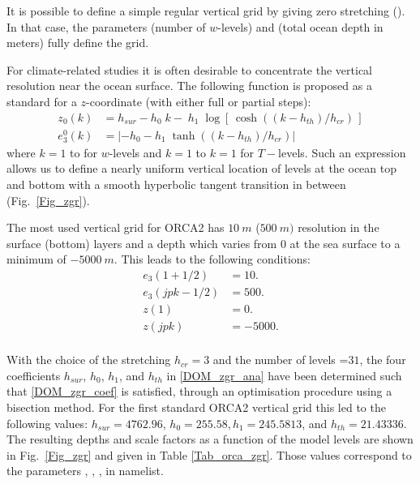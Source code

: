 {It is possible to define a simple regular vertical grid by giving zero stretching (). 
In that case, the parameters  (number of $w$-levels) and  
(total ocean depth in meters) fully define the grid. 

For climate-related studies it is often desirable to concentrate the vertical resolution 
near the ocean surface. The following function is proposed as a standard for a 
$z$-coordinate (with either full or partial steps): 
\begin{equation} \label{DOM_zgr_ana}
\begin{split}
 z_0 (k) 	&= h_{sur} -h_0 \;k-\;h_1 \;\log \left[ {\,\cosh \left( {{(k-h_{th} )} / {h_{cr} }} \right)\,} \right] \\ 
 e_3^0 (k) 	&= \left| -h_0 -h_1 \;\tanh \left( {{(k-h_{th} )} / {h_{cr} }} \right) \right| 
\end{split}
\end{equation}
where $k=1$ to  for $w$-levels and $k=1$ to $k=1$ for $T-$levels. Such an 
expression allows us to define a nearly uniform vertical location of levels at the 
ocean top and bottom with a smooth hyperbolic tangent transition in between 
(Fig.~\ref{Fig_zgr}).

The most used vertical grid for ORCA2 has $10~m$ ($500~m)$ resolution in the 
surface (bottom) layers and a depth which varies from 0 at the sea surface to a 
minimum of $-5000~m$. This leads to the following conditions:
\begin{equation} \label{DOM_zgr_coef}
\begin{split}
 e_3 (1+1/2)		&=10. \\ 
 e_3 (jpk-1/2)	&=500. \\ 
 z(1)			&=0. \\ 
 z(jpk)			&=-5000. \\ 
\end{split}
\end{equation}

With the choice of the stretching $h_{cr} =3$ and the number of levels 
=$31$, the four coefficients $h_{sur}$, $h_{0}$, $h_{1}$, and $h_{th}$ in 
\eqref{DOM_zgr_ana} have been determined such that \eqref{DOM_zgr_coef} is 
satisfied, through an optimisation procedure using a bisection method. For the first 
standard ORCA2 vertical grid this led to the following values: $h_{sur} =4762.96$, 
$h_0 =255.58, h_1 =245.5813$, and $h_{th} =21.43336$. The resulting depths and 
scale factors as a function of the model levels are shown in Fig.~\ref{Fig_zgr} and 
given in Table \ref{Tab_orca_zgr}. Those values correspond to the parameters 
, , ,  in  namelist. 

}
